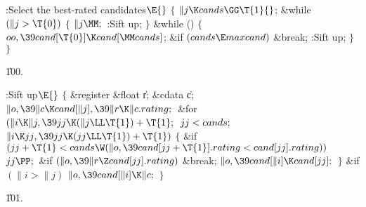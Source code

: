 \Y\B\4:Select the  best-rated candidates\X${}\E{}$\6
${}\{{}$\1\6
${}\|j\K\\{cands}\GG\T{1}{}$;%
\6
\&{while} ${}(\|j>\T{0}){}$\5
${}\{{}$\1\6
${}\|j\MM;{}$\6
:Sift  up\X;\6
\4${}\}{}$\2\6
\&{while} ()\5
${}\{{}$\1\6
${}\\{oo},\39\\{cand}[\T{0}]\K\\{cand}[\MM\\{cands}]{}$;\6
\&{if} ${}(\\{cands}\E\\{maxcand}){}$\1\5
\&{break};\2\6
:Sift  up\X;\6
\4${}\}{}$\2\6
\4${}\}{}$\2\par
\U100.\fi

\B{}:Sift  up\X${}\E{}$\6
${}\{{}$\1\6
\&{register} \&{float} \|r;\6
\&{cdata} \|c;\7
${}\|o,\39\|c\K\\{cand}[\|j],\39\|r\K\|c.\\{rating};{}$\6
\&{for} ${}(\|i\K\|j,\39\\{jj}\K(\|j\LL\T{1})+\T{1};{}$ ${}\\{jj}<\\{cands};{}$
${}\|i\K\\{jj},\39\\{jj}\K(\\{jj}\LL\T{1})+\T{1}){}$\5
${}\{{}$\1\6
\&{if} ${}(\\{jj}+\T{1}<\\{cands}\W(\|o,\39\\{cand}[\\{jj}+\T{1}].\\{rating}<%
\\{cand}[\\{jj}].\\{rating})){}$\1\5
${}\\{jj}\PP;{}$\2\6
\&{if} ${}(\|o,\39\|r\Z\\{cand}[\\{jj}].\\{rating}){}$\1\5
\&{break};\2\6
${}\|o,\39\\{cand}[\|i]\K\\{cand}[\\{jj}];{}$\6
\4${}\}{}$\2\6
\&{if} ${}(\|i>\|j){}$\1\5
${}\|o,\39\\{cand}[\|i]\K\|c;{}$\2\6
\4${}\}{}$\2\par
\U101.\fi

